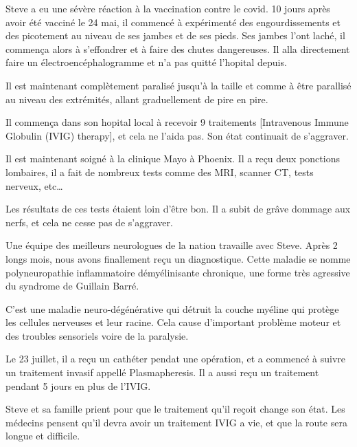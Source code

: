 Steve a eu une sévère réaction à la vaccination contre le covid. 10 jours après
avoir été vacciné le 24 mai, il commencé à expérimenté des engourdissements et
des picotement au niveau de ses jambes et de ses pieds. Ses jambes l'ont laché,
il commença alors à s'effondrer et à faire des chutes dangereuses. Il alla
directement faire un électroencéphalogramme et n'a pas quitté l'hopital depuis.

Il est maintenant complètement paralisé jusqu'à la taille et comme à être
parallisé au niveau des extrémités, allant graduellement de pire en pire.

Il commença dans son hopital local à recevoir 9 traitements [Intravenous Immune
  Globulin (IVIG) therapy], et cela ne l'aida pas. Son état continuait de
s'aggraver.

Il est maintenant soigné à la clinique Mayo à Phoenix. Il a reçu deux ponctions
lombaires, il a fait de nombreux tests comme des MRI, scanner CT, tests nerveux,
etc…

Les résultats de ces tests étaient loin d'être bon. Il a subit de grâve dommage
aux nerfs, et cela ne cesse pas de s'aggraver.

Une équipe des meilleurs neurologues de la nation travaille avec Steve. Après 2
longs mois, nous avons finallement reçu un diagnostique. Cette maladie se nomme
polyneuropathie inflammatoire démyélinisante chronique, une forme très agressive
du syndrome de Guillain Barré.

C'est une maladie neuro-dégénérative qui détruit la couche myéline qui protège
les cellules nerveuses et leur racine. Cela cause d'important problème moteur et
des troubles sensoriels voire de la paralysie.

Le 23 juillet, il a reçu un cathéter pendat une opération, et a commencé à
suivre un traitement invasif appellé Plasmapheresis. Il a aussi reçu un
traitement pendant 5 jours en plus de l'IVIG.

Steve et sa famille prient pour que le traitement qu'il reçoit change son
état. Les médecins pensent qu'il devra avoir un traitement IVIG a vie, et que la
route sera longue et difficile.

